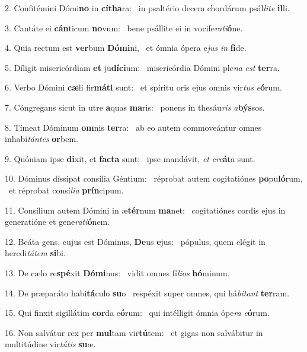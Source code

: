 2. Confitémini Dómi\textbf{no} in \textbf{cí}\textbf{tha}ra: \ast\  in psaltério decem chordárum psál\textit{li}\textit{te} \textbf{il}li.\

3. Cantáte ei \textbf{cán}ticum \textbf{no}vum: \ast\  bene psállite ei in vocife\textit{ra}\textit{ti}\textbf{ó}ne.\

4. Quia rectum est \textbf{ver}bum \textbf{Dó}\textbf{mi}ni, \ast\  et ómnia ópera e\textit{jus} \textit{in} \textbf{fi}de.\

5. Díligit misericórdiam \textbf{et} ju\textbf{dí}\textbf{ci}um: \ast\  misericórdia Dómini ple\textit{na} \textit{est} \textbf{ter}ra.\

6. Verbo Dómini \textbf{cæ}li fir\textbf{má}\textbf{ti} sunt: \ast\  et spíritu oris ejus omnis vir\textit{tus} \textit{e}\textbf{ó}rum.\

7. Cóngregans sicut in utre \textbf{a}quas \textbf{ma}ris: \ast\  ponens in thesáu\textit{ris} \textit{a}\textbf{býs}sos.\

8. Tímeat Dóminum \textbf{om}nis \textbf{ter}ra: \ast\  ab eo autem commoveántur omnes inhabi\textit{tán}\textit{tes} \textbf{or}bem.\

9. Quóniam ipse \textbf{di}xit, et \textbf{fac}\textbf{ta} sunt: \ast\  ipse mandávit, \textit{et} \textit{cre}\textbf{á}ta sunt.\

10. Dóminus díssipat consília Géntium: \dag\  réprobat autem cogitatiónes \textbf{po}pu\textbf{ló}rum, \ast\  et réprobat consí\textit{li}\textit{a} \textbf{prín}cipum.\

11. Consílium autem Dómini in æ\textbf{tér}num \textbf{ma}net: \ast\  cogitatiónes cordis ejus in generatióne et gene\textit{ra}\textit{ti}\textbf{ó}nem.\

12. Beáta gens, cujus est Dóminus, \textbf{De}us \textbf{e}jus: \ast\  pópulus, quem elégit in heredi\textit{tá}\textit{tem} \textbf{si}bi.\

13. De cælo re\textbf{spé}xit \textbf{Dó}\textbf{mi}nus: \ast\  vidit omnes fí\textit{li}\textit{os} \textbf{hó}minum.\

14. De præparáto habi\textbf{tá}culo \textbf{su}o \ast\  respéxit super omnes, qui há\textit{bi}\textit{tant} \textbf{ter}ram.\

15. Qui finxit sigillátim \textbf{cor}da e\textbf{ó}rum: \ast\  qui intélligit ómnia ópe\textit{ra} \textit{e}\textbf{ó}rum.\

16. Non salvátur rex per \textbf{mul}tam vir\textbf{tú}tem: \ast\  et gigas non salvábitur in multitúdine vir\textit{tú}\textit{tis} \textbf{su}æ.\

